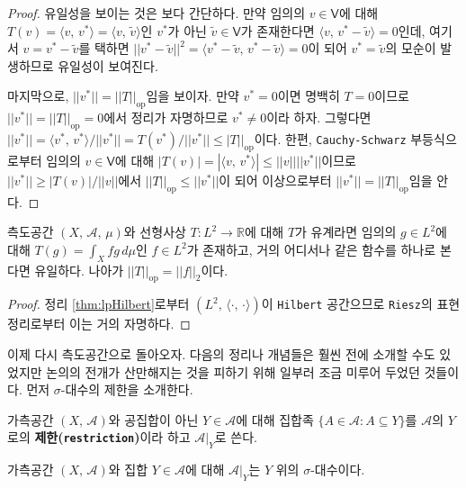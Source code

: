 \begin{proof}
    유일성을 보이는 것은 보다 간단하다. 만약 임의의 $v\in\mathsf{V}$에 대해 $T(v)=\langle v,\,v^*\rangle=\langle v,\,\widetilde{v}\rangle$인 $v^*$가 아닌 $\widetilde{v}\in\mathsf{V}$가 존재한다면 $\langle v,\,v^*-\widetilde{v}\rangle=0$인데, 여기서 $v=v^*-\widetilde{v}$를 택하면 $||v^*-\widetilde{v}||^2=\langle v^*-\widetilde{v},\,v^*-\widetilde{v}\rangle=0$이 되어 $v^*=\widetilde{v}$의 모순이 발생하므로 유일성이 보여진다.

    마지막으로, $||v^*||=||T||_{\mathrm{op}}$임을 보이자. 만약 $v^*=0$이면 명백히 $T=0$이므로 $||v^*||=||T||_\mathrm{op}=0$에서 정리가 자명하므로 $v^*\ne0$이라 하자. 그렇다면 $||v^*||=\langle v^*,\,v^*\rangle/||v^*||=T(v^*)/||v^*||\leq|T||_\mathrm{op}$이다. 한편, \texttt{Cauchy-Schwarz} 부등식으로부터 임의의 $v\in\mathsf{V}$에 대해 $|T(v)|=|\langle v,\,v^*\rangle|\leq||v||||v^*||$이므로 $||v^*||\geq|T(v)|/||v||$에서 $||T||_\mathrm{op}\leq||v^*||$이 되어 이상으로부터 $||v^*||=||T||_{\mathrm{op}}$임을 안다.
\end{proof}

\begin{corollary}
    측도공간 $(X,\,\mathcal{A},\,\mu)$와 선형사상 $T:L^2\to\mathbb{R}$에 대해 $T$가 유계라면 임의의 $g\in L^2$에 대해 $T(g)=\int_Xfg\,d\mu$인 $f\in L^2$가 존재하고, 거의 어디서나 같은 함수를 하나로 본다면 유일하다. 나아가 $||T||_{\mathrm{op}}=||f||_2$이다.
\end{corollary}

\begin{proof}
    정리 \ref{thm:lpHilbert}로부터 $(L^2,\,\langle\cdot,\,\cdot\rangle)$이 \texttt{Hilbert} 공간으므로 \texttt{Riesz}의 표현정리로부터 이는 거의 자명하다.
\end{proof}

이제 다시 측도공간으로 돌아오자. 다음의 정리나 개념들은 훨씬 전에 소개할 수도 있었지만 논의의 전개가 산만해지는 것을 피하기 위해 일부러 조금 미루어 두었던 것들이다. 먼저 $\sigma$-대수의 제한을 소개한다.

\begin{definition}
    가측공간 $(X,\,\mathcal{A})$와 공집합이 아닌 $Y\in\mathcal{A}$에 대해 집합족 $\{A\in\mathcal{A}:A\subseteq Y\}$를 $\mathcal{A}$의 $Y$로의 \textbf{제한(\texttt{restriction})}이라 하고 $\mathcal{A}\vert_Y$로 쓴다.
\end{definition}

\begin{proposition}\label{prop:restrictSigmaAlgebra}
    가측공간 $(X,\,\mathcal{A})$와 집합 $Y\in\mathcal{A}$에 대해 $\mathcal{A}\vert_Y$는 $Y$ 위의 $\sigma$-대수이다.
\end{proposition}

